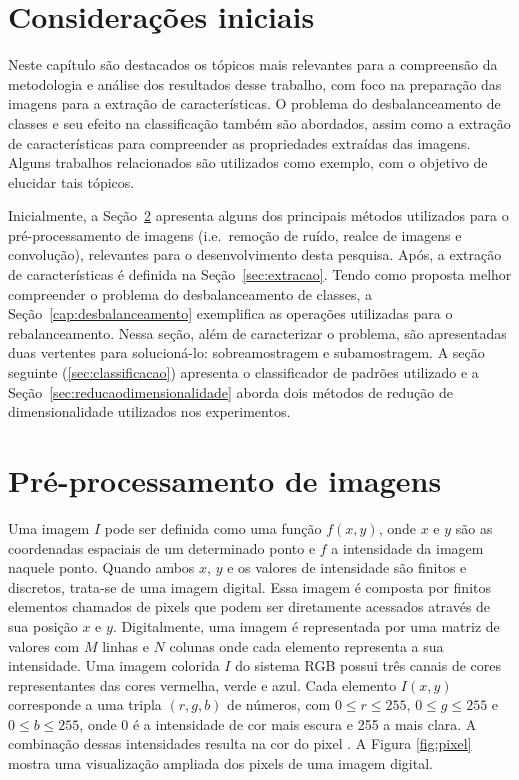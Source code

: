 \section{Considerações iniciais}

Neste capítulo são destacados os tópicos mais relevantes para a compreensão da metodologia e análise dos resultados desse trabalho, com foco na preparação das imagens para a extração de características. O problema do desbalanceamento de classes e seu efeito na classificação também são abordados, assim como a extração de características para compreender as propriedades extraídas das imagens. Alguns trabalhos relacionados são utilizados como exemplo, com o objetivo de elucidar tais tópicos.

Inicialmente, a Seção~\ref{sec:preprocessamento} apresenta alguns dos principais métodos utilizados para o pré-processamento de imagens (i.e.\ remoção de ruído, realce de imagens e convolução), relevantes para o desenvolvimento desta pesquisa. Após, a extração de características é definida na Seção~\ref{sec:extracao}. Tendo como proposta melhor compreender o problema do desbalanceamento de classes, a Seção~\ref{cap:desbalanceamento} exemplifica as operações utilizadas para o rebalanceamento. Nessa seção, além de caracterizar o problema, são apresentadas duas vertentes para solucioná-lo: sobreamostragem e subamostragem. A seção seguinte (\ref{sec:classificacao}) apresenta o classificador de padrões utilizado e a Seção~\ref{sec:reducaodimensionalidade} aborda dois métodos de redução de dimensionalidade utilizados nos experimentos.

\section{Pré-processamento de imagens}
\label{sec:preprocessamento}

Uma imagem $I$ pode ser definida como uma função $f(x,y)$, onde $x$ e $y$ são as coordenadas espaciais de um determinado ponto e $f$ a intensidade da imagem naquele ponto. Quando ambos $x$, $y$ e os valores de intensidade são finitos e discretos, trata-se de uma imagem digital. Essa imagem é composta por finitos elementos chamados de pixels que podem ser diretamente acessados através de sua posição $x$ e $y$. Digitalmente, uma imagem é representada por uma matriz de valores com $M$ linhas e $N$ colunas onde cada elemento representa a sua intensidade. Uma imagem colorida $I$ do sistema RGB possui três canais de cores representantes das cores vermelha, verde e azul. Cada elemento $I(x,y)$ corresponde a uma tripla $(r, g, b)$ de números, com $0 \leq r \leq 255$, $0 \leq g \leq 255$ e $0 \leq b \leq 255$, onde 0 é a intensidade de cor mais escura e 255 a mais clara. A combinação dessas intensidades resulta na cor do pixel \cite{Gonzalez2007}. A Figura \ref{fig:pixel} mostra uma visualização ampliada dos pixels de uma imagem digital.


